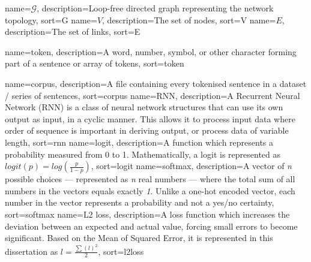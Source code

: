 {
    name=\(\mathcal{G}\),
    description={Loop-free directed graph representing the network topology},
    sort=G
}
{
    name=\(V\),
    description={The set of nodes},
    sort=V
}
{
    name=\(E\),
    description={The set of links},
    sort=E
}

{
    name=token,
    description={A word, number, symbol, or other character forming part of a sentence or array of tokens},
    sort=token
}

{
    name=corpus,
    description={A file containing every tokenised sentence in a dataset / series of sentences},
    sort=corpus
}
{
    name={RNN},
    description={A Recurrent Neural Network (RNN) is a class of neural network structures that
    can use its own output as input, in a cyclic manner. This allows it to process input data where order of sequence is important in deriving output, or process data of variable length},
    sort=rnn
}
{
    name={logit},
    description={A function which represents a probability measured from 0 to 1. Mathematically, a logit is represented as \(logit(p)=log(\frac{p}{1-p})\)},
    sort=logit
}
{
    name={softmax},
    description={A vector of \textit{n} possible choices --- represented as \textit{n} real numbers --- where the total sum of all numbers in the vectors equals exactly \textit{1}. Unlike a one-hot encoded vector, each number in the vector represents a probability and not a yes/no certainty},
    sort=softmax
}
{
    name={L2 loss},
    description={A loss function which increases the deviation between an expected and actual value, forcing small errors to become significant. Based on the Mean of Squared Error, it is represented in this dissertation as \(l=\frac{\sum(l)^2}{2}\)},
    sort=l2loss
}
